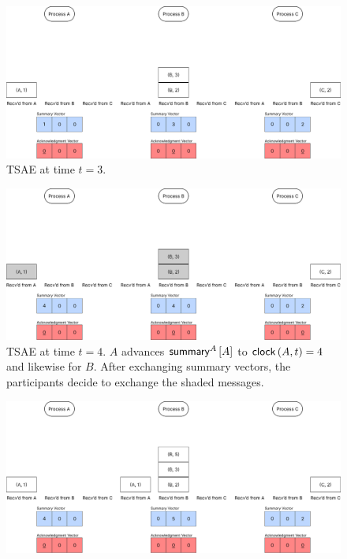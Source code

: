 \documentclass[]             %
{NASA}                       %
\theoremstyle{definition}
\begin{document}
\begin{landscape}
  \begin{figure}[h]%
  \end{figure}
  \begin{figure}[h]
    \centering
    \includegraphics[width=1.4\textwidth]{images/tsaenew/TSAE3.png}
    \caption{TSAE at time $t=3$.}
    \label{fig:tsae1}
  \end{figure}
  \begin{figure}[h]
    \centering
    \includegraphics[width=1.4\textwidth]{images/tsaenew/TSAE4.png}
    \caption{TSAE at time $t=4$. $A$ advances $\mathsf{summary}^{A}\left[A\right]$ to $\mathsf{clock}\left(A, t\right) = 4$ and likewise for $B$. After exchanging summary vectors, the participants decide to exchange the shaded messages.}
    \label{fig:tsae2}
  \end{figure}
  \begin{figure}[h]
    \centering
    \includegraphics[width=1.4\textwidth]{images/tsaenew/TSAE5.png}

\end{figure}
\end{landscape}
\end{document}
